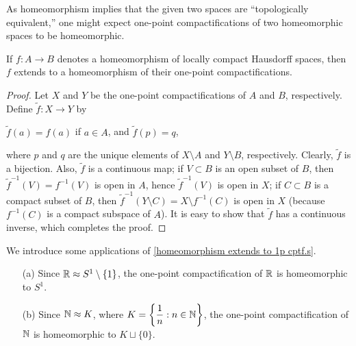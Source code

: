 As homeomorphism implies that the given two spaces are ``topologically equivalent,'' one might expect one-point compactifications of two homeomorphic spaces to be homeomorphic.
\begin{thm}\label{homeomorphism extends to 1p cptf.s}
    If $f: A\rightarrow B$ denotes a homeomorphism of locally compact Hausdorff spaces, then $f$ extends to a homeomorphism of their one-point compactifications.
\end{thm}
\begin{proof}
    Let $X$ and $Y$ be the one-point compactifications of $A$ and $B$, respectively.
    Define $\tilde{f}: X\rightarrow Y$ by
    \begin{center}
        $\tilde{f}(a)=f(a)$ if $a\in A$, and $\tilde{f}(p)=q$,
    \end{center}
    where $p$ and $q$ are the unique elements of $X\setminus A$ and $Y\setminus B$, respectively.
    Clearly, $\tilde{f}$ is a bijection.
    Also, $\tilde{f}$ is a continuous map; if $V\subset B$ is an open subset of $B$, then $\tilde{f}^{-1}(V)=f^{-1}(V)$ is open in $A$, hence $\tilde{f}^{-1}(V)$ is open in $X$; if $C\subset B$ is a compact subset of $B$, then $\tilde{f}^{-1}(Y\setminus C)=X\setminus f^{-1}(C)$ is open in $X$ (because $f^{-1}(C)$ is a compact subspace of $A$).
    It is easy to show that $\tilde{f}$ has a continuous inverse, which completes the proof.
\end{proof}
\begin{exmp}
    We introduce some applications of \cref{homeomorphism extends to 1p cptf.s}.
    \begin{enumerate}
        \item[(a)]
        {
            Since ${\mathbb{R}}\approx S^1\setminus\{1\}$, the one-point compactification of ${\mathbb{R}}$ is homeomorphic to $S^1$.
        }
        \item[(b)]
        {
            Since ${\mathbb{N}}\approx K$, where $K=\left\{\dfrac{1}{n}: n\in{\mathbb{N}}\right\}$, the one-point compactification of ${\mathbb{N}}$ is homeomorphic to $K\sqcup\{0\}$.
        }
    \end{enumerate}
\end{exmp}